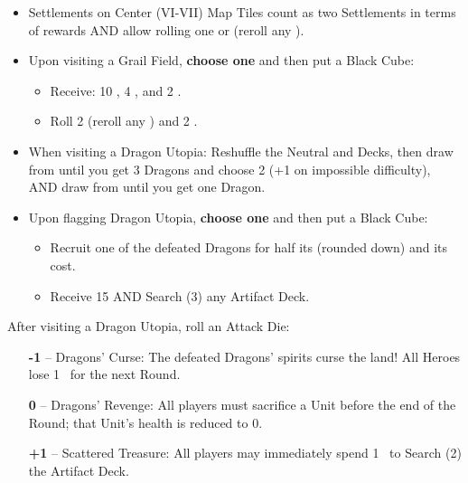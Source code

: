\begin{multicols*}{2}
\begin{itemize}
  \item Settlements on Center (VI-VII) Map Tiles count as two Settlements in terms of rewards AND allow rolling one  or  (reroll any ).

  \item Upon visiting a Grail Field, \textbf{choose one} and then put a Black Cube:
  \begin{itemize}
    \item Receive: 10 , 4 , and 2 .
    \item Roll 2  (reroll any ) and 2 .
  \end{itemize}

  \item When visiting a Dragon Utopia: Reshuffle the Neutral  and  Decks, then draw from  until you get 3 Dragons and choose 2 (+1 on impossible difficulty), AND draw from  until you get one Dragon.
  \item Upon flagging Dragon Utopia, \textbf{choose one} and then put a Black Cube:
  \begin{itemize}
    \item Recruit one of the defeated Dragons for half its  (rounded down) and its  cost.
    \item Receive 15  AND Search (3) any Artifact Deck.
  \end{itemize}
\end{itemize}
After visiting a Dragon Utopia, roll an Attack Die:
\begin{itemize}
  \item[\textbf{-1}] -- Dragons' Curse: The defeated Dragons’ spirits curse the land! All Heroes lose \mbox{1 } for the next Round.
  \item[\textbf{0}] -- Dragons' Revenge: All players must sacrifice a Unit before the end of the Round; that Unit's health is reduced to 0.
  \item[ \textbf{+1}] -- Scattered Treasure: All players may immediately spend \mbox{1 } to Search (2) the Artifact Deck.
\end{itemize}


\end{multicols*}

